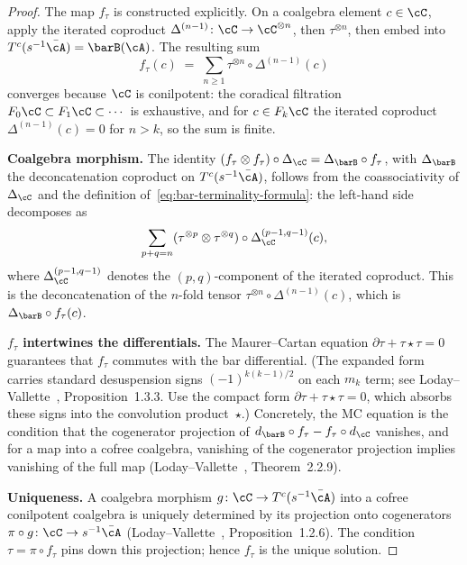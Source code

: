 \begin{proof}
The map $f_\tau$ is constructed explicitly. On a coalgebra element
$c \in \cC$, apply the iterated coproduct
$\Delta^{(n-1)}\colon \cC \to \cC^{\otimes n}$, then $\tau^{\otimes n}$,
then embed into $T^c(s^{-1}\bar{\cA}) = \barB(\cA)$. The resulting
sum
\begin{equation}\label{eq:bar-terminality-formula}
f_\tau(c)
\;=\;
\sum_{n \geq 1} \tau^{\otimes n} \circ \Delta^{(n-1)}(c)
\end{equation}
converges because $\cC$ is conilpotent: the coradical filtration
$F_0\cC \subset F_1\cC \subset \cdots$ is exhaustive, and for
$c \in F_k\cC$ the iterated coproduct $\Delta^{(n-1)}(c) = 0$ for
$n > k$, so the sum is finite.

\medskip\noindent
\textbf{Coalgebra morphism.}
The identity $(f_\tau \otimes f_\tau) \circ \Delta_\cC
= \Delta_{\barB} \circ f_\tau$, with $\Delta_{\barB}$ the
deconcatenation coproduct on $T^c(s^{-1}\bar{\cA})$, follows from
the coassociativity of $\Delta_\cC$ and the definition
of~\eqref{eq:bar-terminality-formula}: the left-hand side decomposes
as
\[
\sum_{p+q = n}
(\tau^{\otimes p} \otimes \tau^{\otimes q})
\circ \Delta^{(p-1,q-1)}_\cC(c),
\]
where $\Delta^{(p-1,q-1)}_\cC$ denotes the $(p,q)$-component of
the iterated coproduct. This is the deconcatenation of
the $n$-fold tensor $\tau^{\otimes n} \circ \Delta^{(n-1)}(c)$,
which is $\Delta_{\barB} \circ f_\tau(c)$.

\medskip\noindent
\textbf{$f_\tau$ intertwines the differentials.}
The Maurer--Cartan equation
$\partial\tau + \tau \star \tau = 0$
guarantees that $f_\tau$ commutes with the bar differential.
(The expanded form carries standard desuspension signs
$(-1)^{k(k-1)/2}$ on each $m_k$ term; see
Loday--Vallette~\cite{LV12}, Proposition~1.3.3. Use the
compact form $\partial\tau + \tau\star\tau = 0$, which absorbs
these signs into the convolution product~$\star$.)
Concretely, the MC equation is the condition that the
cogenerator projection of $d_{\barB} \circ f_\tau - f_\tau \circ
d_\cC$ vanishes, and for a map into a cofree coalgebra, vanishing
of the cogenerator projection implies vanishing of the full map
(Loday--Vallette~\cite{LV12}, Theorem~2.2.9).

\medskip\noindent
\textbf{Uniqueness.}
A coalgebra morphism $g\colon \cC \to T^c(s^{-1}\bar{\cA})$ into
a cofree conilpotent coalgebra is uniquely determined by its
projection onto cogenerators
$\pi \circ g\colon \cC \to s^{-1}\bar{\cA}$
(Loday--Vallette~\cite{LV12}, Proposition~1.2.6).
The condition $\tau = \pi \circ f_\tau$ pins down this projection;
hence $f_\tau$ is the unique solution.
\end{proof}

